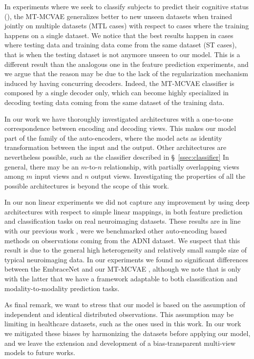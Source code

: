 In experiments where we seek to classify subjects to predict their cognitive status (),
the MT-MCVAE generalizes better to new unseen datasets when trained jointly on multiple datasets (MTL cases) with respect to cases where the training happens on a single dataset.
We notice that the best results happen in cases where testing data and training data come from the same dataset (ST cases), that is when the testing dataset is not anymore unseen to our model.
This is a different result than the analogous one in the feature prediction experiments, and we argue that the reason may be due to the lack of the regularization mechanism induced by having concurring decoders.
Indeed, the MT-MCVAE classifier is composed by a single decoder only, which can become highly specialized in decoding testing data coming from the same dataset of the training data.

In our work we have thoroughly investigated architectures with a one-to-one correspondence between encoding and decoding views.
This makes our model part of the family of the auto-encoders, where the model acts as identity transformation between the input and the output.
Other architectures are nevertheless possible, such as the classifier described in \S~\ref{ssec:classifier}
In general, there may be an $m$-to-$n$ relationship, with partially overlapping views among $m$ input views and $n$ output views.
Investigating the properties of all the possible architectures is beyond the scope of this work.

In our non linear experiments we did not capture any improvement by using deep architectures with respect to simple linear mappings,
in both feature prediction  and classification tasks  on real neuroimaging datasets.
These results are in line with our previous work \citep{Antelmi2019}, were we benchmarked other auto-encoding based methods on observations coming from the ADNI dataset.
We suspect that this result is due to the general high heterogeneity and relatively small sample size of typical neuroimaging data.
In our experiments we found no significant differences between the EmbraceNet and our MT-MCVAE ,
although we note that is only with the latter that we have a framework adaptable to both classification and modality-to-modality prediction tasks.

As final remark, we want to stress that our model is based on the assumption of independent and identical distributed observations.
This assumption may be limiting in healthcare datasets, such as the ones used in this work.
In our work we mitigated these biases by harmonizing the datasets before applying our model, and we leave the extension and development of a bias-transparent multi-view models to future works.

